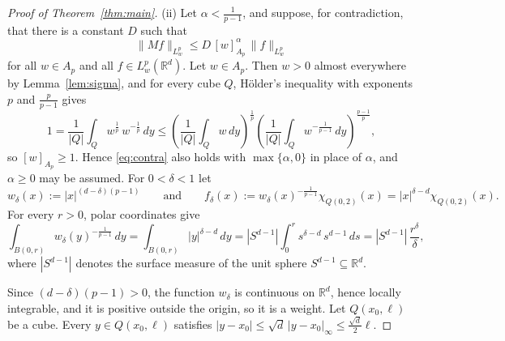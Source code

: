 \documentclass[12pt]{article}
\begin{document}
\begin{proof}[Proof of Theorem~\ref{thm:main}]
(ii) Let $\alpha < \frac{1}{p-1}$, and suppose, for contradiction, that there is a constant $D$ such that
\begin{equation}\label{eq:contra}
  \|Mf\|_{L^p_w} \le D\, [w]_{A_p}^{\alpha}\, \|f\|_{L^p_w}
\end{equation}
for all $w \in A_p$ and all $f \in L^p_w(\mathbb{R}^d)$. Let $w \in A_p$. Then $w > 0$ almost everywhere by Lemma~\ref{lem:sigma}, and for every cube $Q$, H\"older's inequality with exponents $p$ and $\frac{p}{p-1}$ gives
\[
  1 = \frac{1}{|Q|} \int_Q w^{\frac{1}{p}}\, w^{-\frac{1}{p}}\,dy \le \left( \frac{1}{|Q|} \int_Q w\,dy \right)^{\frac{1}{p}} \left( \frac{1}{|Q|} \int_Q w^{-\frac{1}{p-1}}\,dy \right)^{\frac{p-1}{p}},
\]
so $[w]_{A_p} \ge 1$. Hence \eqref{eq:contra} also holds with $\max\{\alpha, 0\}$ in place of $\alpha$, and $\alpha \ge 0$ may be assumed. For $0 < \delta < 1$ let
\[
  w_\delta(x) := |x|^{(d-\delta)(p-1)} \qquad \text{and} \qquad f_\delta(x) := w_\delta(x)^{-\frac{1}{p-1}}\chi_{Q(0,2)}(x) = |x|^{\delta-d}\chi_{Q(0,2)}(x).
\]
For every $r > 0$, polar coordinates give
\begin{equation}\label{eq:polar}
  \int_{B(0,r)} w_\delta(y)^{-\frac{1}{p-1}}\,dy = \int_{B(0,r)} |y|^{\delta - d}\,dy = |S^{d-1}| \int_0^r s^{\delta-d}\, s^{d-1}\,ds = |S^{d-1}|\, \frac{r^\delta}{\delta},
\end{equation}
where $|S^{d-1}|$ denotes the surface measure of the unit sphere $S^{d-1} \subseteq \mathbb{R}^d$.

Since $(d-\delta)(p-1) > 0$, the function $w_\delta$ is continuous on $\mathbb{R}^d$, hence locally integrable, and it is positive outside the origin, so it is a weight. Let $Q(x_0,\ell)$ be a cube. Every $y \in Q(x_0,\ell)$ satisfies $|y - x_0| \le \sqrt{d}\,|y - x_0|_\infty \le \frac{\sqrt{d}}{2}\ell$.


\end{proof}
\end{document}
